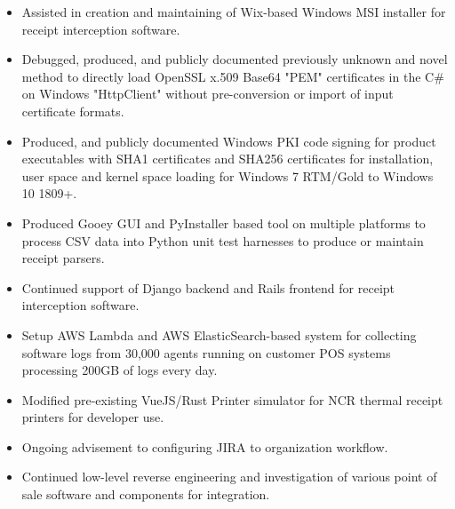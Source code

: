 \documentclass[10pt,letter,ragged2e]{altacv}
\begin{document}
\begin{paracol}{2}
\begin{itemize}
\item Assisted in creation and maintaining of Wix-based Windows MSI installer for receipt interception software.
\item Debugged, produced, and publicly documented previously unknown and novel method to directly load OpenSSL x.509 Base64 "PEM" certificates in the C\# on Windows "HttpClient" without pre-conversion or import of input certificate formats.
\item Produced, and publicly documented Windows PKI code signing for product executables with SHA1 certificates and SHA256 certificates for installation, user space and kernel space loading for Windows 7 RTM/Gold to Windows 10 1809+.
\item Produced Gooey GUI and PyInstaller based tool on multiple platforms to process CSV data into Python unit test harnesses to produce or maintain receipt parsers.
\item Continued support of Django backend and Rails frontend for receipt interception software.
\item Setup AWS Lambda and AWS ElasticSearch-based system for collecting software logs from 30,000 agents running on customer POS systems processing 200GB of logs every day.
\item Modified pre-existing VueJS/Rust Printer simulator for NCR thermal receipt printers for developer use.
\item Ongoing advisement to configuring JIRA to organization workflow.
\item Continued low-level reverse engineering and investigation of various point of sale software and components for integration.
\end{itemize}

\divider



\end{paracol}
\end{document}
